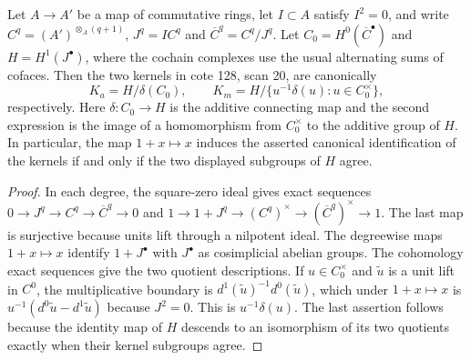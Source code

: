 \begin{proposition}
\label{A4:boundary}
Let $A\to A'$ be a map of commutative rings, let $I\subset A$ satisfy
$I^2=0$, and write $C^q=(A')^{\otimes_A(q+1)}$, $J^q=IC^q$ and
$\overline C^q=C^q/J^q$.  Let
$C_0=H^0(\overline C^\bullet)$ and $H=H^1(J^\bullet)$, where the
cochain complexes use the usual alternating sums of cofaces.  Then the
two kernels in cote 128, scan 20, are canonically
\[
 K_a=H/\delta(C_0),\qquad
 K_m=H/\{u^{-1}\delta(u):u\in C_0^\times\},
\]
respectively.  Here $\delta:C_0\to H$ is the additive connecting map and
the second expression is the image of a homomorphism from
$C_0^\times$ to the additive group of $H$.  In particular, the map
$1+x\mapsto x$ induces the asserted canonical identification of the
kernels if and only if the two displayed subgroups of $H$ agree.
\end{proposition}
\begin{proof}
In each degree, the square-zero ideal gives exact sequences
$0\to J^q\to C^q\to\overline C^q\to0$ and
$1\to1+J^q\to(C^q)^\times\to(\overline C^q)^\times\to1$.
The last map is surjective because units lift through a nilpotent ideal.
The degreewise maps $1+x\mapsto x$ identify $1+J^\bullet$ with
$J^\bullet$ as cosimplicial abelian groups.  The cohomology exact sequences
give the two quotient descriptions.  If $u\in C_0^\times$ and $\widetilde u$
is a unit lift in $C^0$, the multiplicative boundary is
$d^1(\widetilde u)^{-1}d^0(\widetilde u)$, which under $1+x\mapsto x$ is
$u^{-1}(d^0\widetilde u-d^1\widetilde u)$ because $J^2=0$.
This is $u^{-1}\delta(u)$.  The last assertion follows because the identity
map of $H$ descends to an isomorphism of its two quotients exactly when
their kernel subgroups agree.
\end{proof}


